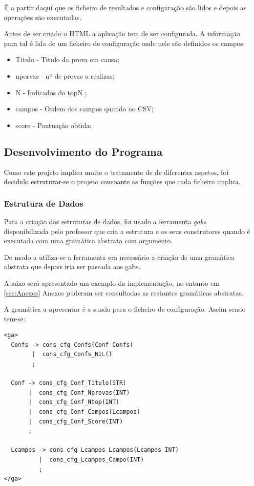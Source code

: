 \documentclass[11pt, a4paper, oneside]{article}
\begin{document}
É a partir daqui que os ficheiro de resultados e configuração são lidos e depois as operações são executadas. 

Antes de ser criado o HTML a aplicação tem de ser configurada.
A informação para tal é lida de um ficheiro de configuração onde nele são definidos os campos:
\begin{itemize}
\item Titulo - Titulo da prova em causa;
\item nporvas - nº de provas a realizar;
\item N - Indicados do topN ;
\item campos - Ordem dos campos quando no CSV;
\item score - Pontuação obtida;
\end{itemize}




\newpage

\subsection{Desenvolvimento do Programa}
Como este projeto implica muito o tratamento de de diferentes aspetos, foi decidido estruturar-se o projeto consoante as  funções que cada ficheiro implica.

\subsubsection{Estrutura de Dados}
Para a criação das estruturas de dados, foi usado a ferramenta \textit{gabs} disponibilizada pelo professor que cria a estrutura e os seus construtores quando é executada com uma gramática abstrata com argumento.

De modo a utiliza-se a ferramenta era necessário a criação de uma gramática abstrata que depois iria ser passada aos gabs.

Abaixo será apresentado um exemplo da implementação, no entanto em \ref{sec:Anexos} Anexos  puderam ser consultadas as restantes gramáticas abstratas.

A gramática a apresentar é a suada para o ficheiro de configuração. Assim sendo tem-se:
\begin{verbatim}
<ga>
  Confs -> cons_cfg_Confs(Conf Confs)
        |  cons_cfg_Confs_NIL()
        ;

  Conf -> cons_cfg_Conf_Titulo(STR)
       |  cons_cfg_Conf_Nprovas(INT)
       |  cons_cfg_Conf_Ntop(INT)
       |  cons_cfg_Conf_Campos(Lcampos)
       |  cons_cfg_Conf_Score(INT)
       ;

  Lcampos -> cons_cfg_Lcampos_Lcampos(Lcampos INT)
          |  cons_cfg_Lcampos_Campo(INT)
          ;
</ga>
\end{verbatim}
\end{document}
